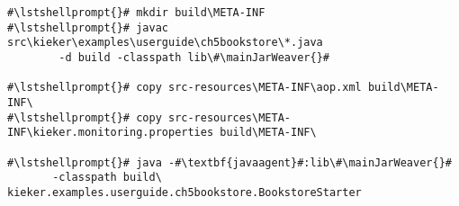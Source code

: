 \begin{lstlisting}[caption=Commands to compile and run the annotated Bookstore under Windows, label=lst:traceAnalysisCompileRunExample1Win]
#\lstshellprompt{}# mkdir build\META-INF
#\lstshellprompt{}# javac src\kieker\examples\userguide\ch5bookstore\*.java
        -d build -classpath lib\#\mainJarWeaver{}#

#\lstshellprompt{}# copy src-resources\META-INF\aop.xml build\META-INF\
#\lstshellprompt{}# copy src-resources\META-INF\kieker.monitoring.properties build\META-INF\

#\lstshellprompt{}# java -#\textbf{javaagent}#:lib\#\mainJarWeaver{}#
       -classpath build\ kieker.examples.userguide.ch5bookstore.BookstoreStarter
\end{lstlisting}
